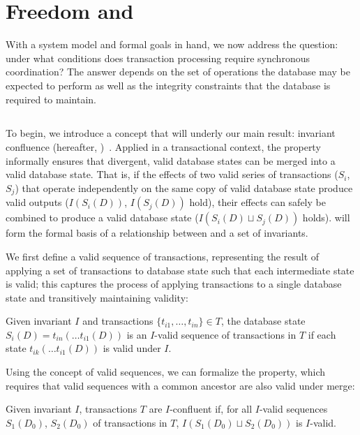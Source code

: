 
\section{Freedom and \iconfluence}
\label{sec:bcc-theory}

With a system model and formal goals in hand, we now address the
question: under what conditions does transaction processing require
synchronous coordination? The answer depends on the set of operations
the database may be expected to perform as well as the integrity
constraints that the database is required to maintain.

\subsection{\iconfluence}

To begin, we introduce a concept that will underly our main result:
invariant confluence (hereafter,
\iconfluence)~\cite{obs-confluence}. Applied in a transactional
context, the \iconfluence property informally ensures that divergent,
valid database states can be merged into a valid database state. That
is, if the effects of two valid series of transactions ($S_i$, $S_j$)
that operate independently on the same copy of valid database state
produce valid outputs ($I(S_i(D))$, $I(S_j(D))$ hold), their effects
can safely be combined to produce a valid database state ($I(S_i(D)
\sqcup S_j(D))$ holds). \iconfluence will form the formal basis of a
relationship between \cfreedom and a set of invariants.

We first define a valid sequence of transactions, representing the
result of applying a set of transactions to database state such that
each intermediate state is valid; this captures the process of
applying transactions to a single database state and transitively
maintaining validity:

\begin{definition}
Given invariant $I$ and transactions $\{t_{i1}, \dots, t_{in}\} \in
T$, the database state $S_i(D) = t_{in}(\dots t_{i1}(D))$ is an
$I$-valid sequence of transactions in $T$ if each state $t_{ik}(\dots
t_{i1}(D))$ is valid under $I$.
\end{definition}

Using the concept of valid sequences, we can formalize the
\iconfluence property, which requires that valid sequences with a
common ancestor are also valid under merge:

\begin{definition}[\iconfluence]
Given invariant $I$, transactions $T$ are $I$-confluent if, for all
$I$-valid sequences $S_1(D_0)$, $S_2(D_0)$ of transactions in $T$,
$I(S_1(D_0) \sqcup S_2(D_0))$ is $I$-valid.
\end{definition}

